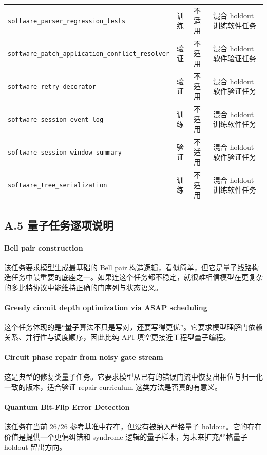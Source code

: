 \documentclass[11pt,a4paper]{article}
\newcommand{\code}[1]{\begingroup\ttfamily\footnotesize\nolinkurl{#1}\endgroup}
\begin{document}
\begin{longtable}{T{3.0cm} p{2.1cm} p{2.1cm} p{5.7cm}}
\code{software_parser_regression_tests} & 训练 & 不适用 & 混合 holdout 训练软件任务 \\
\code{software_patch_application_conflict_resolver} & 验证 & 不适用 & 混合 holdout 软件验证任务 \\
\code{software_retry_decorator} & 验证 & 不适用 & 混合 holdout 软件验证任务 \\
\code{software_session_event_log} & 训练 & 不适用 & 混合 holdout 训练软件任务 \\
\code{software_session_window_summary} & 验证 & 不适用 & 混合 holdout 软件验证任务 \\
\code{software_tree_serialization} & 训练 & 不适用 & 混合 holdout 训练软件任务 \\
\bottomrule
\end{longtable}
\normalsize

\subsection{A.5 量子任务逐项说明}

\paragraph{Bell pair construction}
该任务要求模型生成最基础的 Bell pair 构造逻辑，看似简单，但它是量子线路构造任务中最重要的底座之一。如果连这个任务都不稳定，就很难相信模型在更复杂的多比特协议中能维持正确的门序列与状态语义。

\paragraph{Greedy circuit depth optimization via ASAP scheduling}
这个任务体现的是“量子算法不只是写对，还要写得更优”。它要求模型理解门依赖关系、并行性与调度顺序，因此比纯 API 填空更接近工程型量子编程。

\paragraph{Circuit phase repair from noisy gate stream}
这是典型的修复类量子任务。它要求模型从已有的错误门流中恢复出相位与归一化一致的版本，适合验证 repair curriculum 这类方法是否真的有意义。

\paragraph{Quantum Bit-Flip Error Detection}
该任务在当前 26/26 参考基准中存在，但没有被纳入严格量子 holdout。它的存在价值是提供一个更偏纠错和 syndrome 逻辑的量子样本，为未来扩充严格量子 holdout 留出方向。
\end{document}
